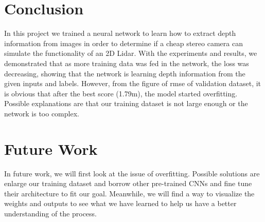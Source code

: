 \documentclass[10pt,twocolumn,letterpaper]{article}
\begin{document}
\section{Conclusion}
In this project we trained a neural network to learn how to extract depth information from images in order to determine if a cheap stereo camera can simulate the functionality of an 2D Lidar. With the experiments and results, we demonstrated that as more training data was fed in the network, the loss was decreasing, showing that the network is learning depth information from the given inputs and labels. However, from the figure of rmse of validation dataset, it is obvious that after the best score (1.79m), the model started overfitting. Possible explanations are that our training dataset is not large enough or the network is too complex. 

\section{Future Work}

In future work, we will first look at the issue of overfitting. Possible solutions are enlarge our training dataset and borrow other pre-trained CNNs and fine tune their architecture to fit our goal. Meanwhile, we will find a way to visualize the weights and outputs to see what we have learned to help us have a better understanding of the process. 

{\small


}
\end{document}
